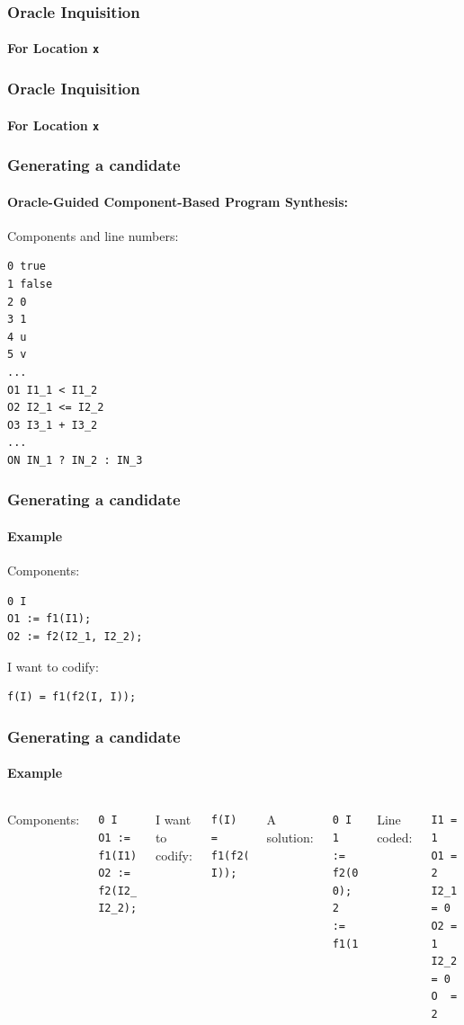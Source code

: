 \documentclass{beamer}
\begin{document}
\frame
{
  \frametitle{Oracle Inquisition}
  \framesubtitle{For Location \texttt{x}}
  \begin{center}
  
  \end{center}
}

\frame
{
  \frametitle{Oracle Inquisition}
  \framesubtitle{For Location \texttt{x}}
  \begin{center}
  
  \end{center}
}

\begin{frame}[fragile]
  \frametitle{Generating a candidate}
  \framesubtitle{Oracle-Guided Component-Based Program Synthesis:}
  Components and line numbers:
\begin{verbatim}
0 true
1 false
2 0
3 1
4 u
5 v
...
O1 I1_1 < I1_2
O2 I2_1 <= I2_2
O3 I3_1 + I3_2
...
ON IN_1 ? IN_2 : IN_3
\end{verbatim}
\end{frame}

\begin{frame}[fragile]
  \frametitle{Generating a candidate}
  \framesubtitle{Example}
  Components:
\begin{verbatim}
0 I
O1 := f1(I1);
O2 := f2(I2_1, I2_2);
\end{verbatim}
I want to codify:
\begin{verbatim}
f(I) = f1(f2(I, I));
\end{verbatim}
\end{frame}

\begin{frame}[fragile]
  \frametitle{Generating a candidate}
  \framesubtitle{Example}
\begin{columns}
  Components:
\begin{verbatim}
0 I
O1 := f1(I1);
O2 := f2(I2_1, I2_2);
\end{verbatim}
I want to codify:
\begin{verbatim}
f(I) = f1(f2(I, I));
\end{verbatim}
A solution:
\begin{verbatim}
0 I
1 := f2(0, 0);
2 := f1(1);
\end{verbatim}
Line coded:
\begin{verbatim}
I1 = 1    O1 = 2
I2_1 = 0  O2 = 1
I2_2 = 0  O  = 2
\end{verbatim}
\end{columns}
\end{frame}
\end{document}

